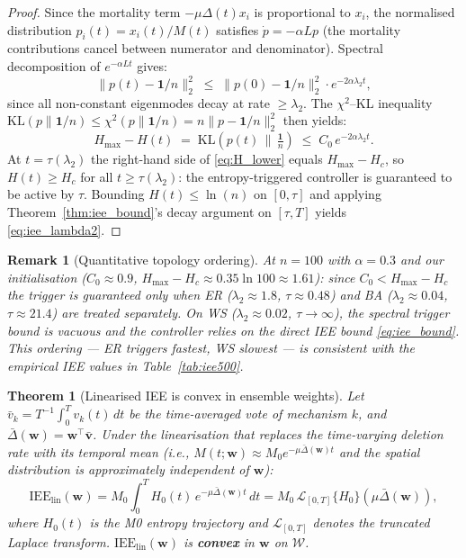 \documentclass[review,12pt]{elsarticle}
\newcommand{\bfw}{\mathbf{w}}
\newcommand{\bfv}{\mathbf{v}}
\newcommand{\IEE}{\mathrm{IEE}}
\newcommand{\Hc}{H_c}
\newcommand{\Hmax}{H_{\max}}
\newcommand{\lambdat}{\lambda_2}
\newtheorem{theorem}{Theorem}
\newtheorem{remark}{Remark}
\begin{document}
\begin{proof}
Since the mortality term $-\mu\Delta(t)x_i$ is proportional to $x_i$,
the normalised distribution $p_i(t) = x_i(t)/M(t)$ satisfies
$\dot{p} = -\alpha Lp$ (the mortality contributions cancel between
numerator and denominator).  Spectral decomposition of $e^{-\alpha Lt}$
gives:
\[
  \|p(t) - \mathbf{1}/n\|_2^2 \;\leq\; \|p(0) - \mathbf{1}/n\|_2^2
    \cdot e^{-2\alpha\lambdat t},
\]
since all non-constant eigenmodes decay at rate $\geq \lambda_2$.
The $\chi^2$--KL inequality $\mathrm{KL}(p\|\mathbf{1}/n) \leq \chi^2(p\|\mathbf{1}/n)
= n\|p - \mathbf{1}/n\|_2^2$ then yields:
\begin{equation}
  \Hmax - H(t) \;=\; \mathrm{KL}\!\left(p(t)\,\Big\|\,\tfrac{\mathbf{1}}{n}\right)
  \;\leq\; C_0\,e^{-2\alpha\lambdat t}.
  \label{eq:H_lower}
\end{equation}
At $t = \tau(\lambdat)$ the right-hand side of \eqref{eq:H_lower} equals
$\Hmax - \Hc$, so $H(t) \geq \Hc$ for all $t \geq \tau(\lambdat)$:
the entropy-triggered controller is guaranteed to be active by $\tau$.
Bounding $H(t) \leq \ln(n)$ on $[0,\tau]$ and applying
Theorem~\ref{thm:iee_bound}'s decay argument on $[\tau, T]$ yields
\eqref{eq:iee_lambda2}.
\end{proof}

\begin{remark}[Quantitative topology ordering]
\label{rem:lambda2}
At $n=100$ with $\alpha=0.3$ and our initialisation ($C_0\approx 0.9$,
$\Hmax-\Hc\approx 0.35\ln 100 \approx 1.61$): since $C_0 < \Hmax-\Hc$
the trigger is guaranteed only when ER ($\lambdat\approx 1.8$, $\tau\approx
0.48$) and BA ($\lambdat\approx 0.04$, $\tau\approx 21.4$) are treated
separately.  On WS ($\lambdat\approx 0.02$, $\tau\to\infty$), the spectral
trigger bound is vacuous and the controller relies on the direct IEE bound
\eqref{eq:iee_bound}.  This ordering --- ER triggers fastest, WS slowest
--- is consistent with the empirical IEE values in Table~\ref{tab:iee500}.
\end{remark}

\begin{theorem}[Linearised IEE is convex in ensemble weights]
\label{thm:lin_convex}
Let $\bar{v}_k = T^{-1}\!\int_0^T\! v_k(t)\,dt$ be the time-averaged vote
of mechanism $k$, and $\bar{\Delta}(\bfw) = \bfw^\top\bar{\bfv}$.
Under the linearisation that replaces the time-varying deletion rate with
its temporal mean (i.e., $M(t;\bfw) \approx M_0 e^{-\mu\bar{\Delta}(\bfw)t}$
and the spatial distribution is approximately independent of $\bfw$):
\begin{equation}
  \IEE_{\mathrm{lin}}(\bfw)
    = M_0 \int_0^T H_0(t)\,e^{-\mu\bar{\Delta}(\bfw)t}\,dt
    = M_0\,\mathcal{L}_{[0,T]}\{H_0\}\!\left(\mu\bar{\Delta}(\bfw)\right),
  \label{eq:iee_lin}
\end{equation}
where $H_0(t)$ is the M0 entropy trajectory and $\mathcal{L}_{[0,T]}$
denotes the truncated Laplace transform. $\IEE_{\mathrm{lin}}(\bfw)$ is
\textbf{convex} in $\bfw$ on $\mathcal{W}$.
\end{theorem}
\end{document}
